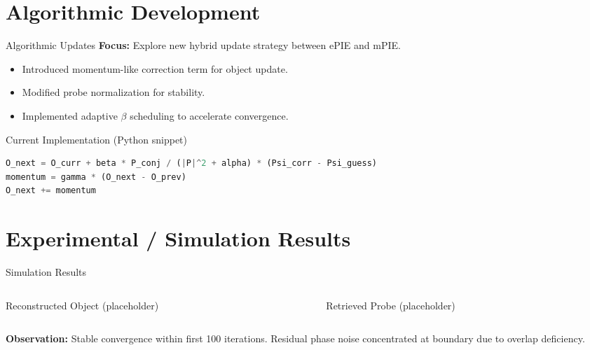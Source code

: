 \documentclass[15pt]{beamer}
\begin{document}
\section{Algorithmic Development}
\begin{frame}[fragile]{Algorithmic Updates}
\footnotesize
\textbf{Focus:} Explore new hybrid update strategy between ePIE and mPIE.

\begin{itemize}
  \item Introduced momentum-like correction term for object update.
  \item Modified probe normalization for stability.
  \item Implemented adaptive $\beta$ scheduling to accelerate convergence.
\end{itemize}

\vspace{2mm}
\begin{exampleblock}{Current Implementation (Python snippet)}
\scriptsize
\begin{lstlisting}[language=Python]
O_next = O_curr + beta * P_conj / (|P|^2 + alpha) * (Psi_corr - Psi_guess)
momentum = gamma * (O_next - O_prev)
O_next += momentum
\end{lstlisting}
\end{exampleblock}
\end{frame}


\section{Experimental / Simulation Results}
\begin{frame}{Simulation Results}
\footnotesize
\begin{columns}[T,totalwidth=\textwidth]
  \begin{column}{0.5\textwidth}
    \centering
    \scriptsize Reconstructed Object (placeholder)
  \end{column}
  \begin{column}{0.5\textwidth}
    \centering
    \scriptsize Retrieved Probe (placeholder)
  \end{column}
\end{columns}

\vspace{3mm}
\scriptsize
\textbf{Observation:}  
Stable convergence within first 100 iterations.  
Residual phase noise concentrated at boundary due to overlap deficiency.
\end{frame}
\end{document}
